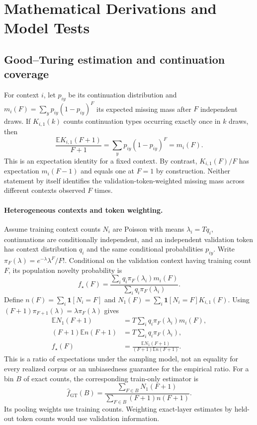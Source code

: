 \section{Mathematical Derivations and Model Tests}
\label{app:math}

\subsection{Good--Turing estimation and continuation coverage}
\label{app:gt-identity}
For context $i$, let $p_{iy}$ be its continuation distribution and $m_i(F)=\sum_y p_{iy}(1-p_{iy})^F$ its expected missing mass after $F$ independent draws. If $K_{i,1}(k)$ counts continuation types occurring exactly once in $k$ draws, then
\begin{equation}
\frac{\mathbb E K_{i,1}(F+1)}{F+1}
=\sum_y p_{iy}(1-p_{iy})^F=m_i(F).
\label{eq:gt-single-context}
\end{equation}
This is an expectation identity for a fixed context. By contrast, $K_{i,1}(F)/F$ has expectation $m_i(F-1)$ and equals one at $F=1$ by construction. Neither statement by itself identifies the validation-token-weighted missing mass across different contexts observed $F$ times.

\paragraph{Heterogeneous contexts and token weighting.}
Assume training context counts $N_i$ are Poisson with means $\lambda_i=Tq_i$, continuations are conditionally independent, and an independent validation token has context distribution $q_i$ and the same conditional probabilities $p_{iy}$. Write $\pi_F(\lambda)=e^{-\lambda}\lambda^F/F!$. Conditional on the validation context having training count $F$, its population novelty probability is
\begin{equation}
f_\star(F)=\frac{\sum_i q_i\pi_F(\lambda_i)m_i(F)}{\sum_i q_i\pi_F(\lambda_i)}.
\end{equation}
Define $n(F)=\sum_i\mathbf1[N_i=F]$ and $N_1(F)=\sum_i\mathbf1[N_i=F]K_{i,1}(F)$. Using $(F+1)\pi_{F+1}(\lambda)=\lambda\pi_F(\lambda)$ gives
\begin{equation}
\begin{aligned}
\mathbb E N_1(F+1)&=T\sum_i q_i\pi_F(\lambda_i)m_i(F),\\
(F+1)\mathbb E n(F+1)&=T\sum_i q_i\pi_F(\lambda_i),\\
f_\star(F)&=\frac{\mathbb E N_1(F+1)}{(F+1)\mathbb E n(F+1)}.
\end{aligned}
\label{eq:gt-poisson}
\end{equation}
This is a ratio of expectations under the sampling model, not an equality for every realized corpus or an unbiasedness guarantee for the empirical ratio. For a bin $B$ of exact counts, the corresponding train-only estimator is
\begin{equation}
\widehat f_{\mathrm{GT}}(B)=\frac{\sum_{F\in B}N_1(F+1)}{\sum_{F\in B}(F+1)n(F+1)}.
\label{eq:gt-bin}
\end{equation}
Its pooling weights use training counts. Weighting exact-layer estimates by held-out token counts would use validation information.

